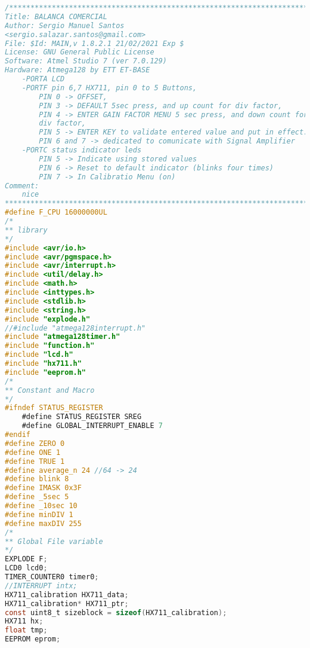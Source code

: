 \begin{lstlisting}[language=C, caption={main.c}, label=main-c, captionpos=b]
/************************************************************************
Title: BALANCA COMERCIAL
Author: Sergio Manuel Santos
<sergio.salazar.santos@gmail.com>
File: $Id: MAIN,v 1.8.2.1 21/02/2021 Exp $
License: GNU General Public License
Software: Atmel Studio 7 (ver 7.0.129)
Hardware: Atmega128 by ETT ET-BASE
    -PORTA LCD
    -PORTF pin 6,7 HX711, pin 0 to 5 Buttons, 
        PIN 0 -> OFFSET, 
        PIN 3 -> DEFAULT 5sec press, and up count for div factor, 
        PIN 4 -> ENTER GAIN FACTOR MENU 5 sec press, and down count for 
        div factor, 
        PIN 5 -> ENTER KEY to validate entered value and put in effect.
        PIN 6 and 7 -> dedicated to comunicate with Signal Amplifier
    -PORTC status indicator leds
        PIN 5 -> Indicate using stored values
        PIN 6 -> Reset to default indicator (blinks four times)
        PIN 7 -> In Calibratio Menu (on)
Comment:
    nice
************************************************************************/
#define F_CPU 16000000UL
/*
** library
*/
#include <avr/io.h>
#include <avr/pgmspace.h>
#include <avr/interrupt.h>
#include <util/delay.h>
#include <math.h>
#include <inttypes.h>
#include <stdlib.h>
#include <string.h>
#include "explode.h"
//#include "atmega128interrupt.h"
#include "atmega128timer.h"
#include "function.h"
#include "lcd.h"
#include "hx711.h"
#include "eeprom.h"
/*
** Constant and Macro
*/
#ifndef STATUS_REGISTER
	#define STATUS_REGISTER SREG
	#define GLOBAL_INTERRUPT_ENABLE 7
#endif
#define ZERO 0
#define ONE 1
#define TRUE 1
#define average_n 24 //64 -> 24
#define blink 8
#define IMASK 0x3F
#define _5sec 5
#define _10sec 10
#define minDIV 1
#define maxDIV 255
/*
** Global File variable
*/
EXPLODE F;
LCD0 lcd0;
TIMER_COUNTER0 timer0;
//INTERRUPT intx;
HX711_calibration HX711_data;
HX711_calibration* HX711_ptr;
const uint8_t sizeblock = sizeof(HX711_calibration);
HX711 hx;
float tmp;
EEPROM eprom;


\end{lstlisting}
